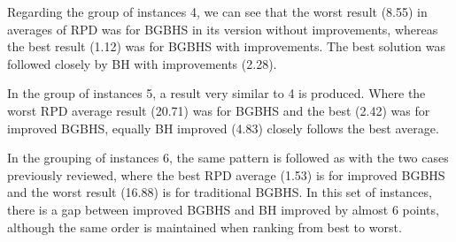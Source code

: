 Regarding the group of instances 4, we can see that the worst result (8.55) in averages of RPD was for BGBHS in its version without improvements, whereas the best result (1.12) was for BGBHS with improvements. The best solution was followed closely by BH with improvements (2.28).

In the group of instances 5, a result very similar to 4 is produced. Where the worst RPD average result (20.71) was for BGBHS and the best (2.42) was for improved BGBHS, equally BH improved (4.83) closely follows the best average.

In the grouping of instances 6, the same pattern is followed as with the two cases previously reviewed, where the best RPD average (1.53) is for improved BGBHS and the worst result (16.88) is for traditional BGBHS. In this set of instances, there is a gap between improved BGBHS and BH improved by almost 6 points, although the same order is maintained when ranking from best to worst.







